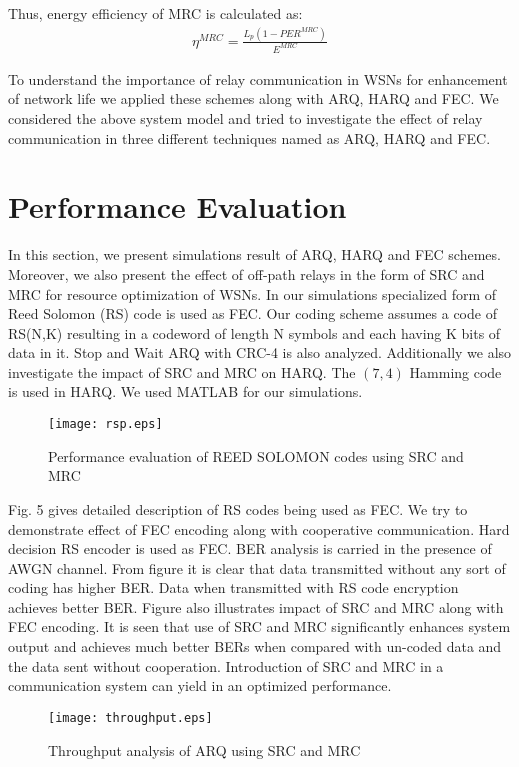 \documentclass{sig-alternate}
\begin{document}
Thus, energy efficiency of MRC is calculated as:
\begin{eqnarray}
\eta^{MRC}=\frac{L_p(1-PER^{MRC})}{E^{MRC}}
\end{eqnarray}

To understand the importance of relay communication in WSNs for enhancement of network life we applied these schemes along with ARQ, HARQ and FEC.
We considered the above system model and tried to investigate the effect of relay communication in three different techniques named as ARQ, HARQ and FEC.

\section{Performance Evaluation}
In this section, we present simulations result of ARQ, HARQ and FEC schemes. Moreover, we also present the effect of off-path relays in the form of SRC and MRC for resource optimization of WSNs. In our simulations specialized form of Reed Solomon (RS) code is used as FEC. Our coding scheme assumes a code of RS(N,K) resulting in a codeword of length N symbols and each having K bits of data in it. Stop and Wait ARQ with CRC-4 is also analyzed. Additionally we also investigate the impact of SRC and MRC on HARQ. The $(7,4)$ Hamming code is used in HARQ. We used MATLAB for our simulations.

\begin{figure}[!ht]
  \centering
  \texttt{[image: rsp.eps]}
   \vspace{-.5cm}
  \caption{Performance evaluation of REED SOLOMON codes using SRC and MRC}
\end{figure}

Fig. 5 gives detailed description of RS codes being used as FEC. We try to demonstrate effect of FEC encoding along with cooperative communication. Hard decision RS encoder is used as FEC. BER analysis is carried in the presence of AWGN channel. From figure it is clear that data transmitted without any sort of coding has higher BER. Data when transmitted with RS code encryption achieves better BER. Figure also illustrates impact of SRC and MRC along with FEC encoding. It is seen that use of SRC and MRC significantly enhances system output and achieves much better BERs when compared with un-coded data and the data sent without cooperation. Introduction of SRC and MRC in a communication system can yield in an optimized performance.
\begin{figure}[!t]
  \centering
  \texttt{[image: throughput.eps]}
  \vspace{-.5cm}
  \caption{Throughput analysis of ARQ using SRC and MRC}
\end{figure}
\end{document}
